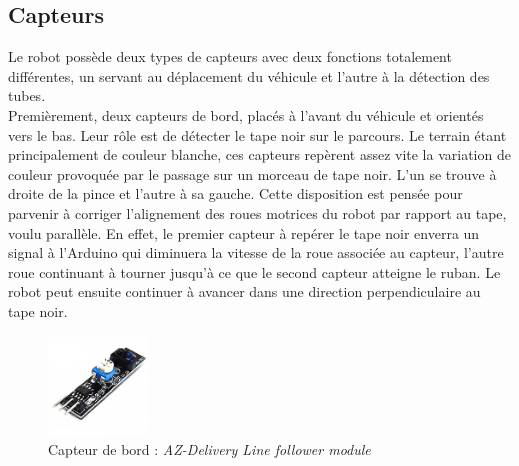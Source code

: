 \documentclass[a4paper,11pt]{article}
\begin{document}
\subsection{\label{subsec:capteurs}Capteurs}

Le robot possède deux types de capteurs avec deux fonctions totalement différentes, un servant au déplacement du véhicule et l'autre à la détection des tubes.\\
Premièrement, deux capteurs de bord, placés à l'avant du véhicule et orientés vers le bas. Leur rôle est de détecter le tape noir sur le parcours. Le terrain étant principalement de couleur blanche, ces capteurs repèrent assez vite la variation de couleur provoquée par le passage sur un morceau de tape noir. L'un se trouve à droite de la pince et l'autre à sa gauche. Cette disposition est pensée pour parvenir à corriger l'alignement des roues motrices du robot par rapport au tape, voulu parallèle. En effet, le premier capteur à repérer le tape noir enverra un signal à l'Arduino qui diminuera la vitesse de la roue associée au capteur, l'autre roue continuant à tourner jusqu'à ce que le second capteur atteigne le ruban. Le robot peut ensuite continuer à avancer dans une direction perpendiculaire au tape noir.

\begin{figure}[H]
    \centering
    \includegraphics[height = 100]{capteurs.jpg}
    \caption{Capteur de bord : \textit{AZ-Delivery Line follower module}\cite{captbor}}
\end{figure}
\newline
\end{document}
